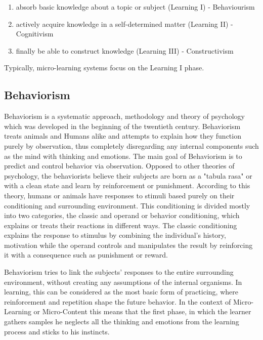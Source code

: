 \begin{enumerate}
    \item absorb basic knowledge about a topic or subject (Learning I) - Behaviourism
    \item actively acquire knowledge in a self-determined matter (Learning II) 
    - 
    Cognitivism
    \item finally be able to construct knowledge (Learning III) - Constructivism
\end{enumerate}

Typically, micro-learning systems focus on the Learning I phase. 

\subsection{Behaviorism}

Behaviorism is a systematic approach, methodology and theory of psychology which
was developed in the beginning of the twentieth century. Behaviorism treats 
animals and Humans alike and attempts to explain how they function 
purely by observation, thus completely disregarding any internal components such 
as the mind with thinking and emotions. The main goal of Behaviorism is to predict
and control behavior via observation. Opposed to other theories of psychology, the
behaviorists believe their subjects are born as a "tabula rasa" or with a 
clean state and learn by reinforcement or punishment. According to this theory,
humans or animals have responses to stimuli based purely on their conditioning
and surrounding environment. This conditioning is divided mostly into two 
categories, the classic and operand or behavior conditioning, which explains or 
treats their reactions in different ways. The classic conditioning explains the 
response to stimulus by combining the individual's history, motivation while 
the operand controls and manipulates the result by reinforcing it with a 
consequence such as punishment or reward.

Behaviorism tries to link the subjects' responses to the entire surrounding 
environment, without creating any assumptions of the internal organisms. In 
learning, this can be considered as the most basic form of practicing, where 
reinforcement and repetition shape the future behavior. In the context of 
Micro-Learning or Micro-Content this means that the first phase, in which the 
learner gathers samples he neglects all the thinking and emotions from the learning
process and sticks to his instincts.



